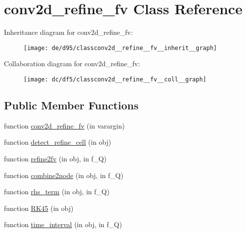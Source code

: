 \hypertarget{classconv2d__refine__fv}{}\section{conv2d\+\_\+refine\+\_\+fv Class Reference}
\label{classconv2d__refine__fv}


Inheritance diagram for conv2d\+\_\+refine\+\_\+fv\+:
\nopagebreak
\begin{figure}[H]
\begin{center}
\leavevmode
\texttt{[image: de/d95/classconv2d\_\_refine\_\_fv\_\_inherit\_\_graph]}
\end{center}
\end{figure}


Collaboration diagram for conv2d\+\_\+refine\+\_\+fv\+:
\nopagebreak
\begin{figure}[H]
\begin{center}
\leavevmode
\texttt{[image: dc/df5/classconv2d\_\_refine\_\_fv\_\_coll\_\_graph]}
\end{center}
\end{figure}
\subsection*{Public Member Functions}
\begin{DoxyCompactItemize}
\item 
function \hyperlink{classconv2d__refine__fv_aacfa0b69ddd6af6a37159f70bc805a7d}{conv2d\+\_\+refine\+\_\+fv} (in varargin)
\item 
function \hyperlink{classconv2d__refine__fv_a132e445d76cccadbbb1907eca6c9f0bd}{detect\+\_\+refine\+\_\+cell} (in obj)
\item 
function \hyperlink{classconv2d__refine__fv_a7b0443ecc15da461ffd39b377cd039ee}{refine2fv} (in obj, in f\+\_\+Q)
\item 
function \hyperlink{classconv2d__refine__fv_a1845bdc57723cafc813dc16bb0583f00}{combine2node} (in obj, in f\+\_\+Q)
\item 
function \hyperlink{classconv2d__refine__fv_a092a5415f982854058d9a759fd1662ec}{rhs\+\_\+term} (in obj, in f\+\_\+Q)
\item 
function \hyperlink{classconv2d__refine__fv_a1985fb639bc7969b36b8a49e9cddb243}{R\+K45} (in obj)
\item 
function \hyperlink{classconv2d__refine__fv_a95917263a42bc76b35ceef69418b59ea}{time\+\_\+interval} (in obj, in f\+\_\+Q)
\end{DoxyCompactItemize}
